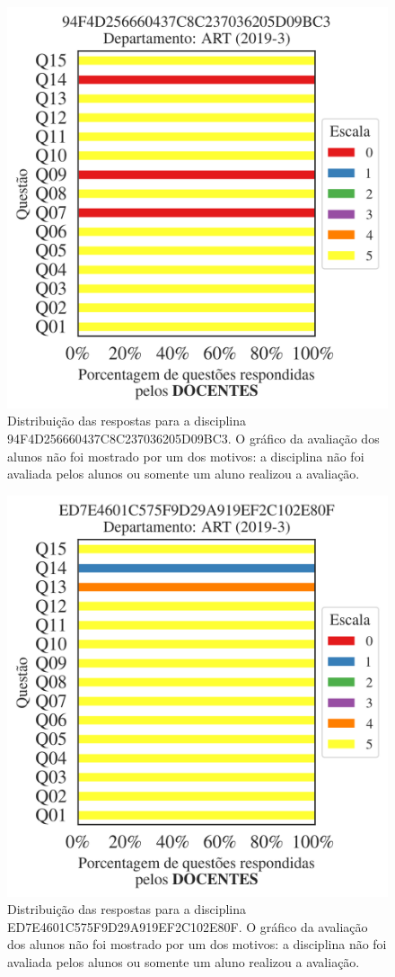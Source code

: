 \documentclass[a4paper,10pt]{article}
\begin{document}
\begin{figure}[h]
\centering
\includegraphics[width=0.485\linewidth]{analise_disciplina_departamento_ART_94F4D256660437C8C237036205D09BC3_docentes.png}
\caption{\label{fig:analise_geral_departamento}                Distribuição das respostas para a disciplina 94F4D256660437C8C237036205D09BC3. O gráfico da avaliação dos alunos não foi mostrado  por um dos motivos:  a disciplina não foi avaliada pelos alunos ou somente um aluno realizou a avaliação. }
\end{figure}
\begin{figure}[h]
\centering
\includegraphics[width=0.485\linewidth]{analise_disciplina_departamento_ART_ED7E4601C575F9D29A919EF2C102E80F_docentes.png}
\caption{\label{fig:analise_geral_departamento}                Distribuição das respostas para a disciplina ED7E4601C575F9D29A919EF2C102E80F. O gráfico da avaliação dos alunos não foi mostrado  por um dos motivos:  a disciplina não foi avaliada pelos alunos ou somente um aluno realizou a avaliação. }
\end{figure}
\end{document}
